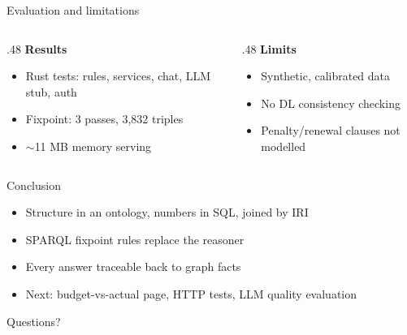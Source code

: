 \documentclass[aspectratio=169,11pt]{beamer}
\begin{document}
\begin{frame}{Evaluation and limitations}
\begin{columns}[T]
\begin{column}{.48\textwidth}
\textbf{Results}
\begin{itemize}\small
\item Rust tests: rules, services, chat, LLM stub, auth
\item Fixpoint: 3 passes, 3,832 triples
\item ${\sim}$11 MB memory serving
\end{itemize}
\end{column}
\begin{column}{.48\textwidth}
\textbf{Limits}
\begin{itemize}\small
\item Synthetic, calibrated data
\item No DL consistency checking
\item Penalty/renewal clauses not modelled
\end{itemize}
\end{column}
\end{columns}
\end{frame}

\begin{frame}{Conclusion}
\begin{itemize}
\item Structure in an ontology, numbers in SQL, joined by IRI
\item SPARQL fixpoint rules replace the reasoner
\item Every answer traceable back to graph facts
\item Next: budget-vs-actual page, HTTP tests, LLM quality evaluation
\end{itemize}
\vfill\centering\Large Questions?
\end{frame}
\end{document}
